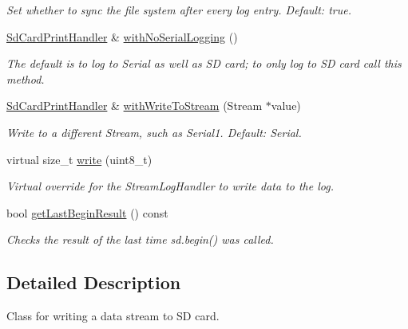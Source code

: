 \begin{DoxyCompactItemize}
\begin{DoxyCompactList}\small\item\em Set whether to sync the file system after every log entry. Default\+: true. \end{DoxyCompactList}\item 
\mbox{\hyperlink{class_sd_card_print_handler}{Sd\+Card\+Print\+Handler}} \& \mbox{\hyperlink{class_sd_card_print_handler_a4c3cac5a8a622e51ce43d5942dc47c7a}{with\+No\+Serial\+Logging}} ()
\begin{DoxyCompactList}\small\item\em The default is to log to Serial as well as SD card; to only log to SD card call this method. \end{DoxyCompactList}\item 
\mbox{\hyperlink{class_sd_card_print_handler}{Sd\+Card\+Print\+Handler}} \& \mbox{\hyperlink{class_sd_card_print_handler_acdb2ef1ae77acdfd9c3d355548c94750}{with\+Write\+To\+Stream}} (Stream $\ast$value)
\begin{DoxyCompactList}\small\item\em Write to a different Stream, such as Serial1. Default\+: Serial. \end{DoxyCompactList}\item 
\mbox{\label{class_sd_card_print_handler_adf54a74997d6fd7e9043199d0237c4ea}} 
virtual size\+\_\+t \mbox{\hyperlink{class_sd_card_print_handler_adf54a74997d6fd7e9043199d0237c4ea}{write}} (uint8\+\_\+t)
\begin{DoxyCompactList}\small\item\em Virtual override for the Stream\+Log\+Handler to write data to the log. \end{DoxyCompactList}\item 
bool \mbox{\hyperlink{class_sd_card_print_handler_ab8e7ac1b3c60f5545ea297e2f04b9ccf}{get\+Last\+Begin\+Result}} () const
\begin{DoxyCompactList}\small\item\em Checks the result of the last time sd.\+begin() was called. \end{DoxyCompactList}\end{DoxyCompactItemize}


\subsection{Detailed Description}
Class for writing a data stream to SD card. 

